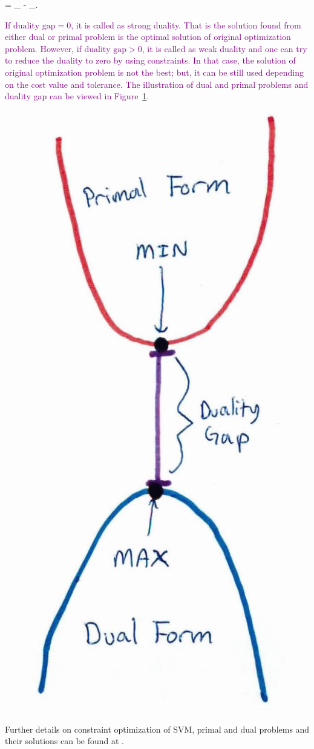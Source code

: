\be
{} = _{} - _{}\:.
\ee

\textcolor{purple}{
If $\text{duality gap} = 0$, it is called as strong duality. That is the solution found from either dual or primal problem is the optimal solution of original optimization problem. However, if $\text{duality gap} > 0$, it is called as weak duality and one can try to reduce the duality to zero by using constraints. In that case, the solution of original optimization problem is not the best; but, it can be still used depending on the cost value and tolerance. The illustration of dual and primal problems and duality gap can be viewed in Figure~\ref{fig:duality_gap}.}

\begin{figure}[h]
	\centering
	\includegraphics[width=.2\linewidth]{fig/duality_gap.jpg}
	\vspace*{2mm}
	\label{fig:duality_gap}
\end{figure}

Further details on constraint optimization of SVM, primal and dual problems and their solutions can be found at  \cite[pg.~13-19]{svm_book}.

